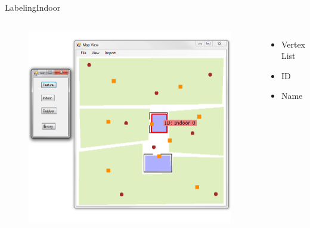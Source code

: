 \begin{frame}{Labeling}{Indoor}

\begin{columns}
\begin{figure}
\centering
\includegraphics[width = \textwidth]{./screenshot/indoor_label.png}
\end{figure}

\begin{minipage}{\textwidth}
\begin{itemize}
\item Vertex List
\item ID
\item Name
\end{itemize}
\end{minipage}
\end{columns}

\end{frame}

